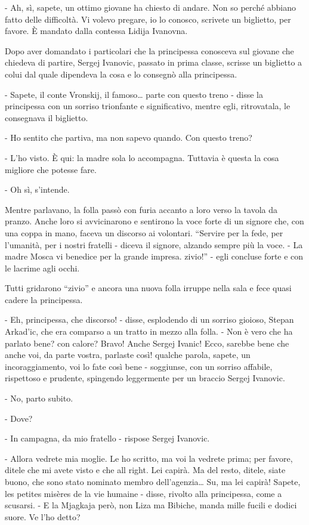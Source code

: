 - Ah, sì, sapete, un ottimo giovane ha chiesto di andare. Non so perché abbiano fatto delle difficoltà. Vi volevo pregare, io lo conosco, scrivete un biglietto, per favore. È mandato dalla contessa Lidija Ivanovna. 

Dopo aver domandato i particolari che la principessa conosceva sul giovane che chiedeva di partire, Sergej Ivanovic, passato in prima classe, scrisse un biglietto a colui dal quale dipendeva la cosa e lo consegnò alla principessa. 

- Sapete, il conte Vronskij, il famoso\ldots{} parte con questo treno - disse la principessa con un sorriso trionfante e significativo, mentre egli, ritrovatala, le consegnava il biglietto. 

- Ho sentito che partiva, ma non sapevo quando. Con questo treno? 

- L'ho visto. È qui: la madre sola lo accompagna. Tuttavia è questa la cosa migliore che potesse fare. 

- Oh sì, s'intende. 

Mentre parlavano, la folla passò con furia accanto a loro verso la tavola da pranzo. Anche loro si avvicinarono e sentirono la voce forte di un signore che, con una coppa in mano, faceva un discorso ai volontari. ``Servire per la fede, per l'umanità, per i nostri fratelli - diceva il signore, alzando sempre più la voce. - La madre Mosca vi benedice per la grande impresa. zivio!'' - egli concluse forte e con le lacrime agli occhi. 

Tutti gridarono ``zivio'' e ancora una nuova folla irruppe nella sala e fece quasi cadere la principessa. 

- Eh, principessa, che discorso! - disse, esplodendo di un sorriso gioioso, Stepan Arkad'ic, che era comparso a un tratto in mezzo alla folla. - Non è vero che ha parlato bene? con calore? Bravo! Anche Sergej Ivanic! Ecco, sarebbe bene che anche voi, da parte vostra, parlaste così! qualche parola, sapete, un incoraggiamento, voi lo fate così bene - soggiunse, con un sorriso affabile, rispettoso e prudente, spingendo leggermente per un braccio Sergej Ivanovic. 

- No, parto subito. 

- Dove? 

- In campagna, da mio fratello - rispose Sergej Ivanovic. 

- Allora vedrete mia moglie. Le ho scritto, ma voi la vedrete prima; per favore, ditele che mi avete visto e che all right. Lei capirà. Ma del resto, ditele, siate buono, che sono stato nominato membro dell'agenzia\ldots{} Su, ma lei capirà! Sapete, les petites misères de la vie humaine - disse, rivolto alla principessa, come a scusarsi. - E la Mjagkaja però, non Liza ma Bibiche, manda mille fucili e dodici suore. Ve l'ho detto? 

